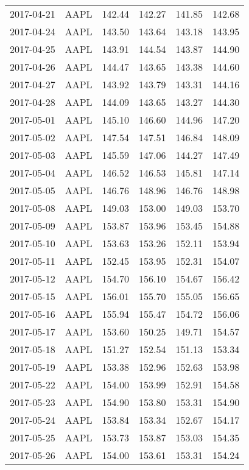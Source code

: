 \documentclass[12pt,a4paper]{report}
\begin{document}
\begin{appendices}
\begin{longtable}{llllll}
  2017-04-21 & AAPL & 142.44 & 142.27 & 141.85 & 142.68 \\ 
  2017-04-24 & AAPL & 143.50 & 143.64 & 143.18 & 143.95 \\ 
  2017-04-25 & AAPL & 143.91 & 144.54 & 143.87 & 144.90 \\ 
  2017-04-26 & AAPL & 144.47 & 143.65 & 143.38 & 144.60 \\ 
  2017-04-27 & AAPL & 143.92 & 143.79 & 143.31 & 144.16 \\ 
  2017-04-28 & AAPL & 144.09 & 143.65 & 143.27 & 144.30 \\ 
  2017-05-01 & AAPL & 145.10 & 146.60 & 144.96 & 147.20 \\ 
  2017-05-02 & AAPL & 147.54 & 147.51 & 146.84 & 148.09 \\ 
  2017-05-03 & AAPL & 145.59 & 147.06 & 144.27 & 147.49 \\ 
  2017-05-04 & AAPL & 146.52 & 146.53 & 145.81 & 147.14 \\ 
  2017-05-05 & AAPL & 146.76 & 148.96 & 146.76 & 148.98 \\ 
  2017-05-08 & AAPL & 149.03 & 153.00 & 149.03 & 153.70 \\ 
  2017-05-09 & AAPL & 153.87 & 153.96 & 153.45 & 154.88 \\ 
  2017-05-10 & AAPL & 153.63 & 153.26 & 152.11 & 153.94 \\ 
  2017-05-11 & AAPL & 152.45 & 153.95 & 152.31 & 154.07 \\ 
  2017-05-12 & AAPL & 154.70 & 156.10 & 154.67 & 156.42 \\ 
  2017-05-15 & AAPL & 156.01 & 155.70 & 155.05 & 156.65 \\ 
  2017-05-16 & AAPL & 155.94 & 155.47 & 154.72 & 156.06 \\ 
  2017-05-17 & AAPL & 153.60 & 150.25 & 149.71 & 154.57 \\ 
  2017-05-18 & AAPL & 151.27 & 152.54 & 151.13 & 153.34 \\ 
  2017-05-19 & AAPL & 153.38 & 152.96 & 152.63 & 153.98 \\ 
  2017-05-22 & AAPL & 154.00 & 153.99 & 152.91 & 154.58 \\ 
  2017-05-23 & AAPL & 154.90 & 153.80 & 153.31 & 154.90 \\ 
  2017-05-24 & AAPL & 153.84 & 153.34 & 152.67 & 154.17 \\ 
  2017-05-25 & AAPL & 153.73 & 153.87 & 153.03 & 154.35 \\ 
  2017-05-26 & AAPL & 154.00 & 153.61 & 153.31 & 154.24 \\ 

\end{longtable}
\end{appendices}
\end{document}

